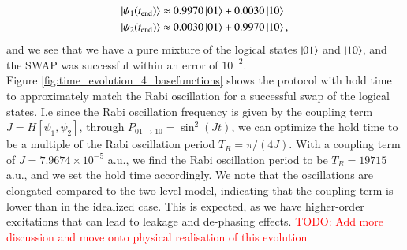 \documentclass{subfiles}
\begin{document}
\begin{align*}
    \ket{\psi_1(t_{\text{end}})} &\approx 0.9970 \ket{01} + 0.0030 \ket{10}  \\
    \ket{\psi_2(t_{\text{end}})} &\approx 0.0030 \ket{01} + 0.9970 \ket{10},
\end{align*}
and we see that we have a pure mixture of the logical states $\ket{01}$ and $\ket{10}$, and the SWAP was successful within an error of $10^{-2}$.
\\
Figure \ref{fig:time_evolution_4_basefunctions} shows the protocol with hold time to approximately match the Rabi oscillation for a successful swap of the logical states. I.e since the Rabi oscillation frequency is given by the coupling term $J = H[\psi_1, \psi_2]$, through $P_{01\to10} = \sin^2(J t)$, we can optimize the hold time to be a multiple of the Rabi oscillation period $T_R = \pi/(4J)$. With a coupling term of $J = 7.9674 \times 10^{-5}$ a.u., we find the Rabi oscillation period to be $T_R = 19715 $ a.u., and we set the hold time accordingly. We note that the oscillations are elongated compared to the two-level model, indicating that the coupling term is lower than in the idealized case. This is expected, as we have higher-order excitations that can lead to leakage and de-phasing effects. \textcolor{red}{TODO: Add more discussion and move onto physical realisation of this evolution}
\end{document}

